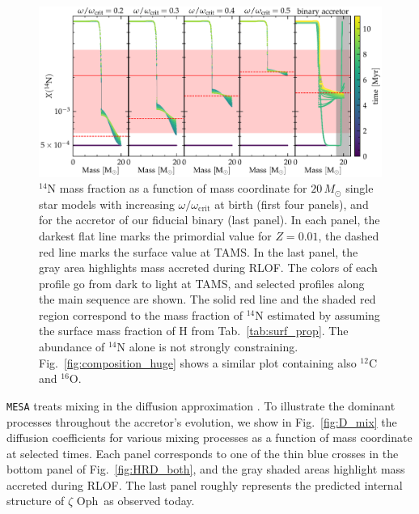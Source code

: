 \documentclass[twocolumn,twocolappendix,trackchanges]{aastex63}
\DeclareRobustCommand{\Figref}[1]{Fig.~\ref{#1}}
\DeclareRobustCommand{\Tabref}[1]{Tab.~\ref{#1}}
\newcommand{\zoph}{$\zeta$ Oph}
\begin{document}
\begin{figure}[htbp]
  \centering
  \includegraphics[width=\textwidth]{n14_struct_complete_zeta_ab}
  \caption{$^{14}\mathrm{N}$ mass fraction as a function of mass
    coordinate for $20\,M_\odot$ single star models with increasing
    $\omega/\omega_\mathrm{crit}$ at birth (first four panels), and
    for the accretor of our fiducial binary (last panel). In each
    panel, the darkest flat line marks the primordial value for
    $Z=0.01$, the dashed red line marks the surface value at
    TAMS. In the last panel, the gray area highlights mass accreted
    during RLOF. The colors of each profile go from dark to light at
    TAMS, and selected profiles along the main sequence are shown. The
    solid red line and the shaded red region correspond to the mass
    fraction of $^{14}\mathrm{N}$ estimated by
     assuming the surface mass fraction of H
    from \Tabref{tab:surf_prop}. The abundance of $^{14}\mathrm{N}$
    alone is not strongly constraining. \Figref{fig:composition_huge}
    shows a similar plot containing also $^{12}\mathrm{C}$ and
    $^{16}\mathrm{O}$.}
  \label{fig:n14}
\end{figure}


\texttt{MESA} treats mixing in the diffusion approximation
\citep{paxton:11}.  To illustrate the dominant processes throughout
the accretor's evolution, we show in \Figref{fig:D_mix} the diffusion
coefficients for various mixing processes as a function of mass
coordinate at selected times. Each panel corresponds to one of the
thin blue crosses in the bottom panel of \Figref{fig:HRD_both}, and
the gray shaded areas highlight mass accreted during RLOF. The last
panel roughly represents the predicted internal structure of \zoph\ as
observed today.
\end{document}
